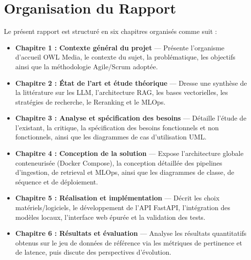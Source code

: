 \section*{Organisation du Rapport}
Le présent rapport est structuré en six chapitres organisés comme suit :

\begin{itemize}
    \item \textbf{Chapitre 1 : Contexte général du projet} — Présente l'organisme d'accueil OWL Media, le contexte du sujet, la problématique, les objectifs ainsi que la méthodologie Agile/Scrum adoptée.
    \item \textbf{Chapitre 2 : État de l'art et étude théorique} — Dresse une synthèse de la littérature sur les LLM, l'architecture RAG, les bases vectorielles, les stratégies de recherche, le Reranking et le MLOps.
    \item \textbf{Chapitre 3 : Analyse et spécification des besoins} — Détaille l'étude de l'existant, la critique, la spécification des besoins fonctionnels et non fonctionnels, ainsi que les diagrammes de cas d'utilisation UML.
    \item \textbf{Chapitre 4 : Conception de la solution} — Expose l'architecture globale conteneurisée (Docker Compose), la conception détaillée des pipelines d'ingestion, de retrieval et MLOps, ainsi que les diagrammes de classe, de séquence et de déploiement.
    \item \textbf{Chapitre 5 : Réalisation et implémentation} — Décrit les choix matériels/logiciels, le développement de l'API FastAPI, l'intégration des modèles locaux, l'interface web épurée et la validation des tests.
    \item \textbf{Chapitre 6 : Résultats et évaluation} — Analyse les résultats quantitatifs obtenus sur le jeu de données de référence via les métriques de pertinence et de latence, puis discute des perspectives d'évolution.
\end{itemize}
